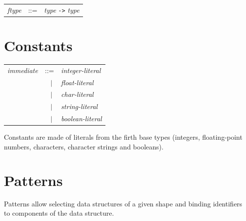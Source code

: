 \documentclass[11pt,titlepage,twoside]{report}
\newcommand{\alt}{\;|\;}
\newcommand{\term}[1]{{\tt #1}}
\newcommand{\nterm}[1]{{\em #1}}
\begin{document}
\begin{center}
  \begin{tabular}{lcl}
\nterm{ftype} & ::=        & \nterm{type} \term{->} \nterm{type}
  \end{tabular}
\end{center}


\section{Constants\label{constants}} %

\begin{center}
\begin{tabular}{lcl}
\nterm{immediate} & ::=           & \nterm{integer-literal} \\
                  & $\;\;\alt$    & \nterm{float-literal} \\
                  & $\;\;\alt$    & \nterm{char-literal} \\
                  & $\;\;\alt$    & \nterm{string-literal} \\
                  & $\;\;\alt$    & \nterm{boolean-literal} \\
\end{tabular}
\end{center}
Constants are made of literals from the firth base types (integers,
floating-point numbers, characters, character strings and booleans).

\section{Patterns\label{patterns}} %

Patterns allow selecting data structures of a given shape and binding
identifiers to components of the data structure.
\end{document}

